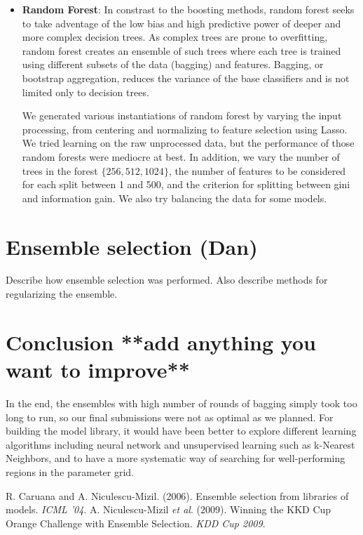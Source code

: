 \documentclass{article}
\renewcommand{\(}{\left(}
\renewcommand{\)}{\right)}
\begin{document}
\begin{itemize}
    \item \textbf{Random Forest}: In constrast to the boosting methods, random forest seeks to take adventage of the low bias and high predictive power of deeper and more complex decision trees.  As complex trees are prone to overfitting, random forest creates an ensemble of such trees where each tree is trained using different subsets of the data (bagging) and features. Bagging, or bootstrap aggregation, reduces the variance of the base classifiers and is not limited only to decision trees.    

      We generated various instantiations of random forest by varying the input processing, from centering and normalizing to feature selection using Lasso.  We tried learning on the raw unprocessed data, but the performance of those random forests were mediocre at best.  In addition, we vary the number of trees in the forest $\{256, 512, 1024\}$, the number of features to be considered for each split between 1 and 500, and the criterion for splitting between gini and information gain.  We also try balancing the data for some models.   
  \end{itemize}

\section{Ensemble selection (Dan)} \label{sec:ensemble}
Describe how ensemble selection was performed. Also describe methods for regularizing the ensemble. 

\section{Conclusion **add anything you want to improve**}
In the end, the ensembles with high number of rounds of bagging simply took too long to run, so our final submissions were not as optimal as we planned.  For building the model library, it would have been better to explore different learning algorithms including neural network and unsupervised learning such as k-Nearest Neighbors, and to have a more systematic way of searching for well-performing regions in the parameter grid.

\begin{thebibliography}{99}
  R. Caruana and A. Niculescu-Mizil.
  (2006).
  Ensemble selection from libraries of models.
  \emph{ICML '04}.
  A. Niculescu-Mizil \emph{et al}.
  (2009).
  Winning the KKD Cup Orange Challenge with Ensemble Selection.
  \emph{KDD Cup 2009}.

\end{thebibliography}
\end{document}
